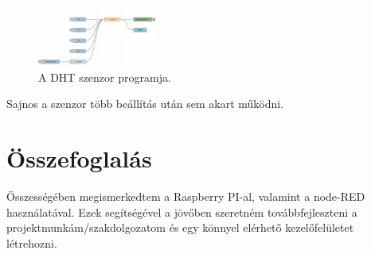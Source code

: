 \documentclass[a4paper,12pt,oneside]{report}
\begin{document}
\begin{figure}[htbp]
	\centering
	\includegraphics[width=0.35\textwidth]{fig/dht.png}
	\caption{A DHT szenzor programja.}
	\label{fig-dht}
\end{figure}

Sajnos a szenzor több beállítás után sem akart működni.

\chapter{Összefoglalás}

Összességében megismerkedtem a Raspberry PI-al, valamint a node-RED használatával. Ezek segítségével a jövőben szeretném 
továbbfejleszteni a projektmunkám/szakdolgozatom és egy könnyel elérhető kezelőfelületet létrehozni.
\end{document}
